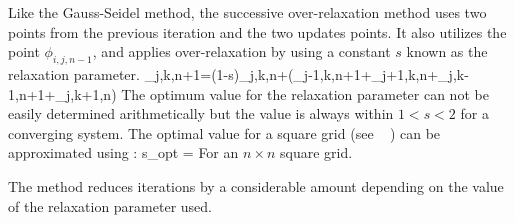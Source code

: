 Like the Gauss-Seidel method, the successive over-relaxation method uses two points from the previous iteration and the two updates points. It also utilizes the point $\phi_{i,j,n-1}$, and applies over-relaxation by using a constant $s$ known as the relaxation parameter.
\be
\phi_{j,k,n+1}=(1-s)\phi_{j,k,n}+(\phi_{j-1,k,n+1}+\phi_{j+1,k,n}+\phi_{j,k-1,n+1}+\phi_{j,k+1,n})
\ee
The optimum value for the relaxation parameter can not be easily determined arithmetically but the value is always within $1<s<2$ for a converging system. The optimal value for a square grid (see ~ \cite{sor}) can be approximated using :
\be
 s_{opt} =  \approx {}
\ee
For an $n \times n$ square grid.

The method reduces iterations by a considerable amount depending on the value of the relaxation parameter used.

